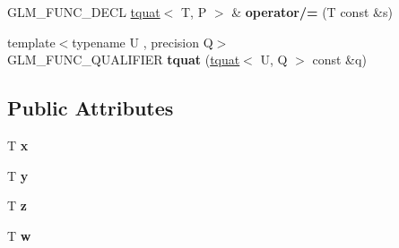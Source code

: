 \begin{DoxyCompactItemize}
\item 
\hypertarget{structglm_1_1detail_1_1tquat_a1a620ff3b4f138ad2f2fa34f36de1097}{G\-L\-M\-\_\-\-F\-U\-N\-C\-\_\-\-D\-E\-C\-L \hyperlink{structglm_1_1detail_1_1tquat}{tquat}$<$ T, P $>$ \& {\bfseries operator/=} (T const \&s)}\label{structglm_1_1detail_1_1tquat_a1a620ff3b4f138ad2f2fa34f36de1097}

\item 
\hypertarget{structglm_1_1detail_1_1tquat_a5a904126767e3f0d447ea22e27447e7e}{{\footnotesize template$<$typename U , precision Q$>$ }\\G\-L\-M\-\_\-\-F\-U\-N\-C\-\_\-\-Q\-U\-A\-L\-I\-F\-I\-E\-R {\bfseries tquat} (\hyperlink{structglm_1_1detail_1_1tquat}{tquat}$<$ U, Q $>$ const \&q)}\label{structglm_1_1detail_1_1tquat_a5a904126767e3f0d447ea22e27447e7e}

\end{DoxyCompactItemize}
\subsection*{Public Attributes}
\begin{DoxyCompactItemize}
\item 
\hypertarget{structglm_1_1detail_1_1tquat_ae4db777c41ba0c7329107a4c7aa1f956}{T {\bfseries x}}\label{structglm_1_1detail_1_1tquat_ae4db777c41ba0c7329107a4c7aa1f956}

\item 
\hypertarget{structglm_1_1detail_1_1tquat_a50895e2da4e59255b25271a44ae3e43d}{T {\bfseries y}}\label{structglm_1_1detail_1_1tquat_a50895e2da4e59255b25271a44ae3e43d}

\item 
\hypertarget{structglm_1_1detail_1_1tquat_a65c2b0af6a4b59327015b766f25416ef}{T {\bfseries z}}\label{structglm_1_1detail_1_1tquat_a65c2b0af6a4b59327015b766f25416ef}

\item 
\hypertarget{structglm_1_1detail_1_1tquat_a83472ee38e4268c15ac92658e1ebfbb0}{T {\bfseries w}}\label{structglm_1_1detail_1_1tquat_a83472ee38e4268c15ac92658e1ebfbb0}

\end{DoxyCompactItemize}


